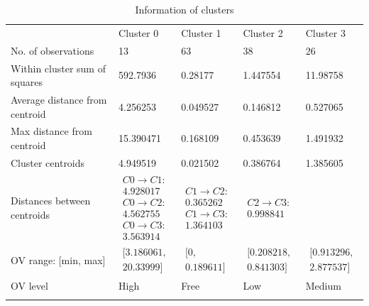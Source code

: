 \begin{table}
\caption{ Information of clusters}
\label{tab:InfCluster}       %
\begin{tabular}{lllll}
\hline\noalign{\smallskip}
& Cluster 0 & Cluster 1 & Cluster 2 & Cluster 3 \\
\noalign{\smallskip}\hline\noalign{\smallskip}
No. of observations	& 13 &	63 &	38 &	26 \\
Within cluster sum of squares &	592.7936 &	0.28177 &	1.447554	& 11.98758 \\
Average distance from centroid &	4.256253 &	 0.049527	& 0.146812 &	0.527065 \\
Max distance from centroid	& 15.390471 &	0.168109 &	0.453639 &	1.491932 \\
Cluster centroids &	4.949519	& 0.021502 &	0.386764 &	1.385605 \\
Distances between centroids  & $\begin{array}{l}  C0 \rightarrow C1:\\
4.928017 \\
C0 \rightarrow C2:\\
4.562755 \\
C0 \rightarrow C3:\\
3.563914 \end{array}$ & $\begin{array}{l} C1 \rightarrow C2:\\
0.365262 \\
C1 \rightarrow C3:\\
1.364103 \end{array}$ & $\begin{array}{l} C2 \rightarrow C3:\\
0.998841 \end{array}$ & \\
OV range: [min, max] & $\begin{array}{l}	[3.186061,\\
20.33999] \end{array}$ & $\begin{array}{l}	[0,\\
0.189611]\end{array}$ & $\begin{array}{l} [0.208218,\\
0.841303] \end{array}$ & $\begin{array}{l} [0.913296, \\ 2.877537] \end{array}$\\
OV level &	High &	Free &	Low	& Medium \\
\noalign{\smallskip}\hline
\end{tabular}
\end{table}

